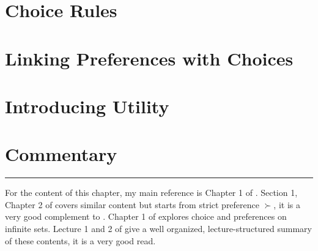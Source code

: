 \section{Choice Rules}\label{chap2:sec2}
%

\section{Linking Preferences with Choices}\label{chap2:sec3}
%

\section{Introducing Utility}\label{chap2:sec4}
%

\section{Commentary}\label{chap2:sec5}
%

\vspace{0.5cm}
\noindent\rule{\textwidth}{0.4pt}

For the content of this chapter, my main reference is Chapter 1 of \citet{mas1995microeconomic}. Section 1, Chapter 2 of \citet{kreps1990acourse} covers similar content but starts from strict preference $\succ$, it is a very
good complement to \citet{mas1995microeconomic}. Chapter 1 of \citet{kreps2013microeconomic} explores choice and preferences on infinite sets. Lecture 1 and 2 of \citet{ariel2012lecture} give a well organized, lecture-structured summary of
these contents, it is a very good read.